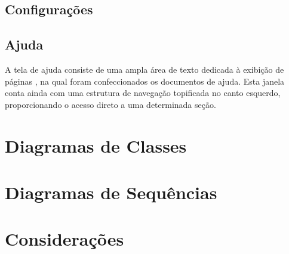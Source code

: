 \subsection{Configurações}



\subsection{Ajuda}

A tela de ajuda consiste de uma ampla área de texto dedicada à exibição de páginas , na qual foram confeccionados os documentos de ajuda.
Esta janela conta ainda com uma estrutura de navegação topificada no canto esquerdo, proporcionando o acesso direto a uma determinada seção.

\section{Diagramas de Classes}

\section{Diagramas de Sequências}
\section{Considerações}
